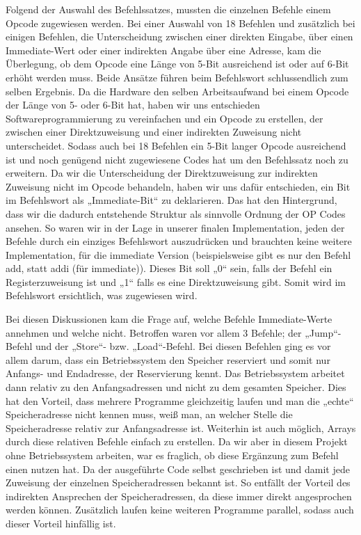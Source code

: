 \documentclass[paper=a4,fontsize=12pt]{scrreprt}
\begin{document}
Folgend der Auswahl des Befehlssatzes, mussten die einzelnen Befehle einem Opcode zugewiesen werden. Bei einer Auswahl von 18 Befehlen und zusätzlich bei einigen Befehlen, die Unterscheidung zwischen einer direkten Eingabe, über einen Immediate-Wert oder einer indirekten Angabe über eine Adresse, kam die Überlegung, ob dem Opcode eine Länge von 5-Bit ausreichend ist oder auf 6-Bit erhöht werden muss. Beide Ansätze führen beim Befehlswort schlussendlich zum selben Ergebnis. Da die Hardware den selben Arbeitsaufwand bei einem Opcode der Länge von 5- oder 6-Bit hat, haben wir uns entschieden Softwareprogrammierung zu vereinfachen und ein Opcode zu erstellen, der zwischen einer Direktzuweisung und einer indirekten Zuweisung nicht unterscheidet. Sodass auch bei 18 Befehlen ein 5-Bit langer Opcode ausreichend ist und noch genügend nicht zugewiesene Codes hat um den Befehlssatz noch zu erweitern. 
Da wir die Unterscheidung der Direktzuweisung zur indirekten Zuweisung nicht im Opcode behandeln, haben wir uns dafür entschieden, ein Bit im Befehlswort als „Immediate-Bit“ zu deklarieren.
Das hat den Hintergrund, dass wir die dadurch entstehende Struktur als sinnvolle Ordnung der OP Codes ansehen. So waren wir in der Lage in unserer finalen Implementation, jeden der Befehle durch ein einziges Befehlswort auszudrücken und brauchten keine weitere Implementation, für die immediate Version (beispielsweise gibt es nur den Befehl add, statt addi (für immediate)). Dieses Bit soll „0“ sein, falls der Befehl ein Registerzuweisung ist und „1“ falls es eine Direktzuweisung gibt. Somit wird im Befehlswort ersichtlich, was zugewiesen wird.

Bei diesen Diskussionen kam die Frage auf, welche Befehle Immediate-Werte annehmen und welche nicht. Betroffen waren vor allem 3 Befehle; der „Jump“-Befehl und der „Store“- bzw. „Load“-Befehl. Bei diesen Befehlen ging es vor allem darum, dass ein Betriebssystem den Speicher reserviert und somit nur Anfangs- und Endadresse, der Reservierung kennt. Das Betriebssystem arbeitet dann relativ zu den Anfangsadressen und nicht zu dem gesamten Speicher. Dies hat den Vorteil, dass mehrere Programme gleichzeitig laufen und man die „echte“ Speicheradresse nicht kennen muss, weiß man, an welcher Stelle die Speicheradresse relativ zur Anfangsadresse ist. Weiterhin ist auch  möglich, Arrays durch diese relativen Befehle einfach zu erstellen. Da wir aber in diesem Projekt ohne Betriebssystem arbeiten, war es fraglich, ob diese Ergänzung zum Befehl einen nutzen hat. Da der ausgeführte Code selbst geschrieben ist und damit jede Zuweisung der einzelnen Speicheradressen bekannt ist. So entfällt der Vorteil des indirekten Ansprechen der Speicheradressen, da diese immer direkt angesprochen werden können. Zusätzlich laufen keine weiteren Programme parallel, sodass auch dieser Vorteil hinfällig ist.
\end{document}
